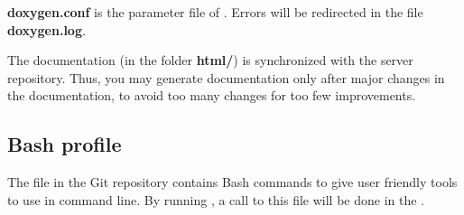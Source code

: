 \documentclass[english,a4paper,twoside]{article}
\begin{document}
\textbf{doxygen.conf} is the parameter file of . Errors will be redirected in the file \textbf{doxygen.log}.

\begin{attention}
The documentation (in the folder \textbf{html/}) is synchronized with the server repository. Thus, you may generate documentation only after major changes in the  documentation, to avoid too many changes for too few improvements.
\end{attention}


\subsection{Bash profile}
The file  in the Git repository contains Bash commands to give user friendly tools to use  in command line. By running , a call to this file will be done in the .



\printindex
\end{document}
